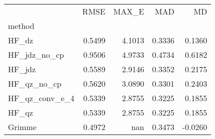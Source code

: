 \begin{tabular}{lrrrr}
 & RMSE & MAX_E & MAD & MD \\
method &  &  &  &  \\
HF_dz & 0.5499 & 4.1013 & 0.3336 & 0.1360 \\
HF_jdz_no_cp & 0.9506 & 4.9733 & 0.4734 & 0.6182 \\
HF_jdz & 0.5589 & 2.9146 & 0.3352 & 0.2175 \\
HF_qz_no_cp & 0.5620 & 3.0890 & 0.3301 & 0.2403 \\
HF_qz_conv_e_4 & 0.5339 & 2.8755 & 0.3225 & 0.1855 \\
HF_qz & 0.5339 & 2.8755 & 0.3225 & 0.1855 \\
Grimme & 0.4972 & nan & 0.3473 & -0.0260 \\
\end{tabular}
